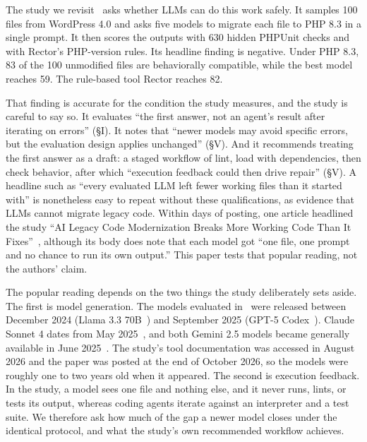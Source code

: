 \documentclass[11pt]{article}
\begin{document}
The study we revisit~\cite{mahmud2026modernization} asks whether LLMs can do this work safely.
It samples 100 files from WordPress 4.0 and asks five models to migrate each file to PHP 8.3 in a single prompt.
It then scores the outputs with 630 hidden PHPUnit checks and with Rector's PHP-version rules.
Its headline finding is negative.
Under PHP 8.3, 83 of the 100 unmodified files are behaviorally compatible, while the best model reaches 59.
The rule-based tool Rector reaches 82.

That finding is accurate for the condition the study measures, and the study is careful to say so.
It evaluates ``the first answer, not an agent's result after iterating on errors'' (\S I).
It notes that ``newer models may avoid specific errors, but the evaluation design applies unchanged'' (\S V).
And it recommends treating the first answer as a draft: a staged workflow of lint, load with dependencies, then check behavior, after which ``execution feedback could then drive repair'' (\S V).
A headline such as ``every evaluated LLM left fewer working files than it started with'' is nonetheless easy to repeat without these qualifications, as evidence that LLMs cannot migrate legacy code.
Within days of posting, one article headlined the study ``AI Legacy Code Modernization Breaks More Working Code Than It Fixes''~\cite{cava2026generativelabs}, although its body does note that each model got ``one file, one prompt and no chance to run its own output.''
This paper tests that popular reading, not the authors' claim.

The popular reading depends on the two things the study deliberately sets aside.
The first is model generation.
The models evaluated in~\cite{mahmud2026modernization} were released between December 2024 (Llama 3.3 70B~\cite{meta2024llama33}) and September 2025 (GPT-5 Codex~\cite{openai2025codex}).
Claude Sonnet 4 dates from May 2025~\cite{anthropic2025claude4}, and both Gemini 2.5 models became generally available in June 2025~\cite{google2025gemini25}.
The study's tool documentation was accessed in August 2026 and the paper was posted at the end of October 2026, so the models were roughly one to two years old when it appeared.
The second is execution feedback.
In the study, a model sees one file and nothing else, and it never runs, lints, or tests its output, whereas coding agents iterate against an interpreter and a test suite.
We therefore ask how much of the gap a newer model closes under the identical protocol, and what the study's own recommended workflow achieves.
\end{document}

